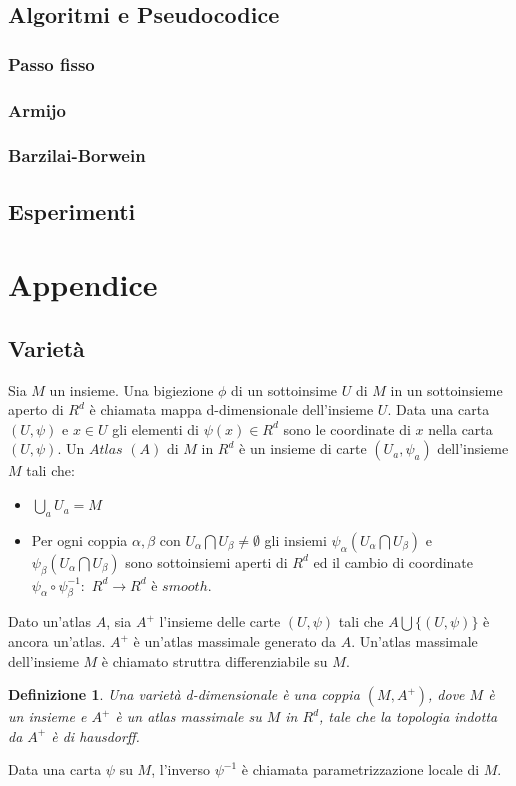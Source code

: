 \documentclass[a4paper, 12pt]{article}
\newtheorem{definition}{Definizione}
\begin{document}
\subsection{Algoritmi e Pseudocodice}
\subsubsection{Passo fisso}
\subsubsection{Armijo}
\subsubsection{Barzilai-Borwein}
\subsection{Esperimenti}
\section{Appendice}

\subsection{Varietà}
Sia $M$ un insieme. Una bigiezione $\phi$ di un sottoinsime $U$ di $M$ in un sottoinsieme aperto di $R^d$ è chiamata mappa d-dimensionale dell'insieme $U$. Data una carta $(U, \psi)$ e $x \in U$ gli elementi di $\psi(x) \in R^d$ sono le coordinate di $x$ nella carta $(U, \psi)$. Un $Atlas$ $(A)$ di $M$ in $R^d$ è un insieme di carte $(U_a, \psi_a)$ dell'insieme $M$ tali che:
\begin{itemize}
    \item $\bigcup_a U_a = M$
    \item Per ogni coppia $\alpha, \beta$ con $U_{\alpha} \bigcap U_{\beta} \neq \emptyset$ gli insiemi $\psi_{\alpha}(U_{\alpha} \bigcap U_{\beta})$ e $\psi_{\beta}(U_{\alpha} \bigcap U_{\beta})$ sono sottoinsiemi aperti di $R^d$ ed il cambio di coordinate $\psi_{\alpha} \circ \psi_{\beta}^{-1}:$ $R^d \to R^d$ è $smooth$.
\end{itemize}
Dato un'atlas $A$, sia $A^+$ l'insieme delle carte $(U, \psi)$ tali che $A \bigcup \{(U, \psi)\}$ è ancora un'atlas. $A^+$ è un'atlas massimale generato da $A$. Un'atlas massimale dell'insieme $M$ è chiamato struttra differenziabile su $M$.
\begin{definition}
Una varietà d-dimensionale è una coppia $(M, A^+)$, dove $M$ è un insieme e $A^+$ è un atlas massimale su $M$ in $R^d$, tale che la topologia indotta da $A^+$ è di hausdorff.
\end{definition}
Data una carta $\psi$ su $M$, l'inverso $\psi^{-1}$ è chiamata parametrizzazione locale di $M$.
\end{document}
